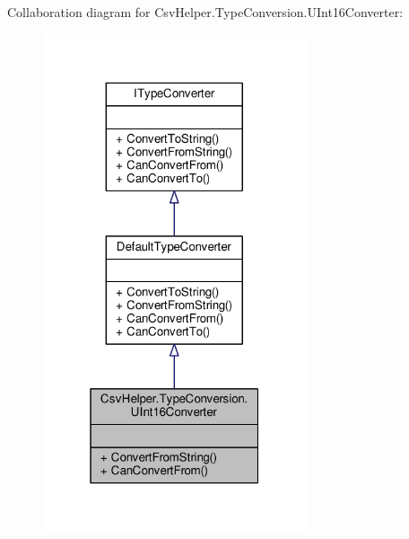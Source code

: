 Collaboration diagram for Csv\-Helper.\-Type\-Conversion.\-U\-Int16\-Converter\-:
\nopagebreak
\begin{figure}[H]
\begin{center}
\leavevmode
\includegraphics[width=220pt]{d1/d69/a00507}
\end{center}
\end{figure}
